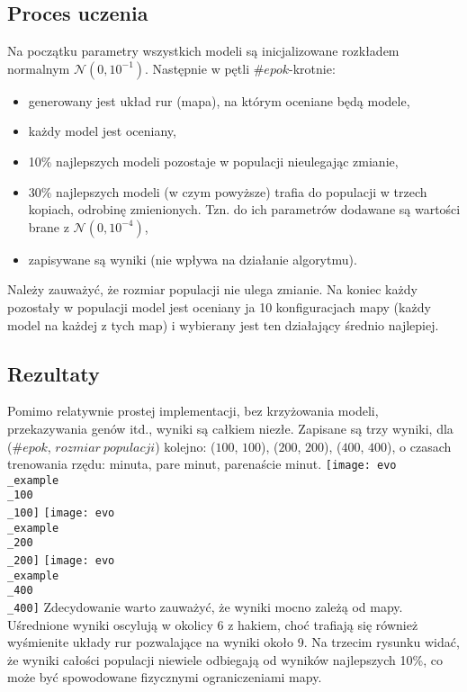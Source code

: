 \documentclass[12pt, A4]{article}
\begin{document}
\subsection{Proces uczenia}
Na początku parametry wszystkich modeli są inicjalizowane rozkładem normalnym $\mathcal{N}(0, 10^{-1})$.
Następnie w pętli $\#epok$-krotnie:
\begin{itemize}
	\item generowany jest układ rur (mapa), na którym oceniane będą modele,
	\item każdy model jest oceniany,
	\item 10\% najlepszych modeli pozostaje w populacji nieulegając zmianie,
	\item 30\% najlepszych modeli (w czym powyższe) trafia do populacji w trzech kopiach, odrobinę zmienionych. Tzn. do ich parametrów dodawane są wartości brane z $\mathcal{N}(0, 10^{-4})$,
	\item zapisywane są wyniki (nie wpływa na działanie algorytmu).
\end{itemize}
Należy zauważyć, że rozmiar populacji nie ulega zmianie.
\newline
Na koniec każdy pozostały w populacji model jest oceniany ja 10 konfiguracjach mapy (każdy model na każdej z tych map) i wybierany jest ten działający średnio najlepiej.

\subsection{Rezultaty}
Pomimo relatywnie prostej implementacji, bez krzyżowania modeli, przekazywania genów itd., wyniki są całkiem niezłe. Zapisane są trzy wyniki, dla ($\#epok$, $rozmiar \ populacji$) kolejno: ($100$, $100$), ($200$, $200$), ($400$, $400$), o czasach trenowania rzędu: minuta, pare minut, parenaście minut.
\newline
\texttt{[image: evo\\\_example\\\_100\\\_100]}
\texttt{[image: evo\\\_example\\\_200\\\_200]}
\newline
\texttt{[image: evo\\\_example\\\_400\\\_400]}
\newline
Zdecydowanie warto zauważyć, że wyniki mocno zależą od mapy. Uśrednione wyniki oscylują w okolicy 6 z hakiem, choć trafiają się również wyśmienite układy rur pozwalające na wyniki około 9.
\newline
Na trzecim rysunku widać, że wyniki całości populacji niewiele odbiegają od wyników najlepszych 10\%, co może być spowodowane fizycznymi ograniczeniami mapy.
\end{document}
